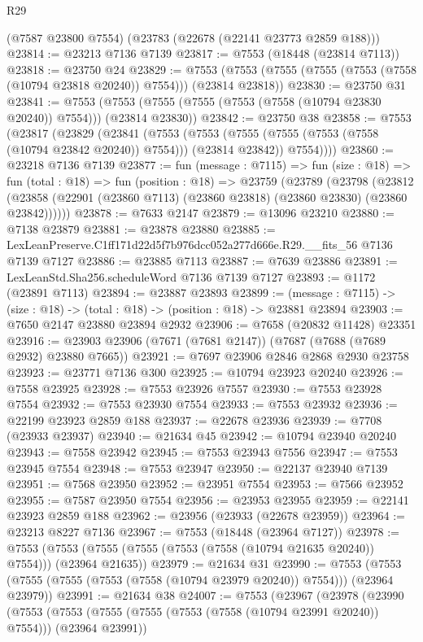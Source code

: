 \begin{lexlean}{R29}
\begin{coremodule}
    (@7587 @23800 @7554)
    (@23783 (@22678 (@22141 @23773 @2859 @188)))
@23814 := @23213 @7136 @7139
@23817 := @7553 (@18448 (@23814 @7113))
@23818 := @23750 @24
@23829 := @7553 (@7553 (@7555 (@7555 (@7553 (@7558 (@10794 @23818 @20240)) @7554))) (@23814 @23818))
@23830 := @23750 @31
@23841 := @7553 (@7553 (@7555 (@7555 (@7553 (@7558 (@10794 @23830 @20240)) @7554))) (@23814 @23830))
@23842 := @23750 @38
@23858 := @7553
    (@23817
      (@23829
        (@23841
          (@7553
            (@7553 (@7555 (@7555 (@7553 (@7558 (@10794 @23842 @20240)) @7554))) (@23814 @23842))
            @7554))))
@23860 := @23218 @7136 @7139
@23877 := fun (message : @7115) =>
  fun (size : @18) =>
  fun (total : @18) =>
  fun (position : @18) =>
  @23759
    (@23789
      (@23798
        (@23812 (@23858 (@22901 (@23860 @7113) (@23860 @23818) (@23860 @23830) (@23860 @23842))))))
@23878 := @7633 @2147
@23879 := @13096 @23210
@23880 := @7138 @23879
@23881 := @23878 @23880
@23885 := LexLeanPreserve.C1ff171d22d5f7b976dcc052a277d666e.R29.__fits_56 @7136 @7139 @7127
@23886 := @23885 @7113
@23887 := @7639 @23886
@23891 := LexLeanStd.Sha256.scheduleWord @7136 @7139 @7127
@23893 := @1172 (@23891 @7113)
@23894 := @23887 @23893
@23899 := (message : @7115) -> (size : @18) -> (total : @18) -> (position : @18) -> @23881 @23894
@23903 := @7650 @2147 @23880 @23894 @2932
@23906 := @7658 (@20832 @11428) @23351
@23916 := @23903 @23906 (@7671 (@7681 @2147)) (@7687 (@7688 (@7689 @2932) @23880 @7665))
@23921 := @7697 @23906 @2846 @2868 @2930 @23758
@23923 := @23771 @7136 @300
@23925 := @10794 @23923 @20240
@23926 := @7558 @23925
@23928 := @7553 @23926 @7557
@23930 := @7553 @23928 @7554
@23932 := @7553 @23930 @7554
@23933 := @7553 @23932
@23936 := @22199 @23923 @2859 @188
@23937 := @22678 @23936
@23939 := @7708 (@23933 @23937)
@23940 := @21634 @45
@23942 := @10794 @23940 @20240
@23943 := @7558 @23942
@23945 := @7553 @23943 @7556
@23947 := @7553 @23945 @7554
@23948 := @7553 @23947
@23950 := @22137 @23940 @7139
@23951 := @7568 @23950
@23952 := @23951 @7554
@23953 := @7566 @23952
@23955 := @7587 @23950 @7554
@23956 := @23953 @23955
@23959 := @22141 @23923 @2859 @188
@23962 := @23956 (@23933 (@22678 @23959))
@23964 := @23213 @8227 @7136
@23967 := @7553 (@18448 (@23964 @7127))
@23978 := @7553 (@7553 (@7555 (@7555 (@7553 (@7558 (@10794 @21635 @20240)) @7554))) (@23964 @21635))
@23979 := @21634 @31
@23990 := @7553 (@7553 (@7555 (@7555 (@7553 (@7558 (@10794 @23979 @20240)) @7554))) (@23964 @23979))
@23991 := @21634 @38
@24007 := @7553
    (@23967
      (@23978
        (@23990
          (@7553
            (@7553 (@7555 (@7555 (@7553 (@7558 (@10794 @23991 @20240)) @7554))) (@23964 @23991))

\end{coremodule}
\end{lexlean}
